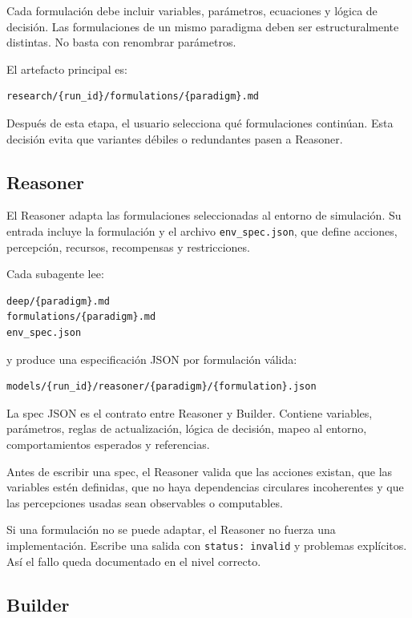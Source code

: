 Cada formulación debe incluir variables, parámetros, ecuaciones y lógica de
decisión. Las formulaciones de un mismo paradigma deben ser estructuralmente
distintas. No basta con renombrar parámetros.

El artefacto principal es:

\begin{verbatim}
research/{run_id}/formulations/{paradigm}.md
\end{verbatim}

Después de esta etapa, el usuario selecciona qué formulaciones continúan. Esta
decisión evita que variantes débiles o redundantes pasen a Reasoner.

\subsection{Reasoner}

El Reasoner adapta las formulaciones seleccionadas al entorno de simulación. Su
entrada incluye la formulación y el archivo \texttt{env\_spec.json}, que define
acciones, percepción, recursos, recompensas y restricciones.

Cada subagente lee:

\begin{verbatim}
deep/{paradigm}.md
formulations/{paradigm}.md
env_spec.json
\end{verbatim}

y produce una especificación JSON por formulación válida:

\begin{verbatim}
models/{run_id}/reasoner/{paradigm}/{formulation}.json
\end{verbatim}

La spec JSON es el contrato entre Reasoner y Builder. Contiene variables,
parámetros, reglas de actualización, lógica de decisión, mapeo al entorno,
comportamientos esperados y referencias.

Antes de escribir una spec, el Reasoner valida que las acciones existan, que las
variables estén definidas, que no haya dependencias circulares incoherentes y
que las percepciones usadas sean observables o computables.

Si una formulación no se puede adaptar, el Reasoner no fuerza una
implementación. Escribe una salida con \texttt{status: invalid} y problemas
explícitos. Así el fallo queda documentado en el nivel correcto.

\subsection{Builder}

